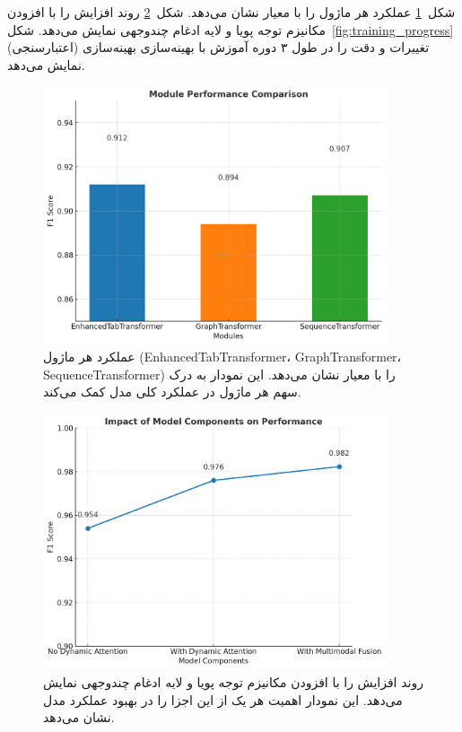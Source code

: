 شکل~\ref{fig:module_comparison} عملکرد هر ماژول را با معیار  نشان می‌دهد. شکل~\ref{fig:ablation_study} روند افزایش  را با افزودن مکانیزم توجه پویا و لایه ادغام چندوجهی نمایش می‌دهد. شکل~\ref{fig:training_progress} تغییرات  و دقت را در طول ۳ دوره آموزش با بهینه‌سازی بهینه‌سازی (اعتبارسنجی) نمایش می‌دهد.

\begin{figure}[h!]
\centering
\includegraphics[width=0.9\textwidth]{images/fig_module_comparison_en}
\caption{عملکرد هر ماژول (EnhancedTabTransformer، GraphTransformer، SequenceTransformer) را با معیار  نشان می‌دهد. این نمودار به درک سهم هر ماژول در عملکرد کلی مدل کمک می‌کند.}
\label{fig:module_comparison}
\end{figure}

\begin{figure}[h!]
\centering
\includegraphics[width=0.9\textwidth]{images/fig_ablation_study_en}
\caption{روند افزایش  را با افزودن مکانیزم توجه پویا و لایه ادغام چندوجهی نمایش می‌دهد. این نمودار اهمیت هر یک از این اجزا را در بهبود عملکرد مدل نشان می‌دهد.}
\label{fig:ablation_study}
\end{figure}

